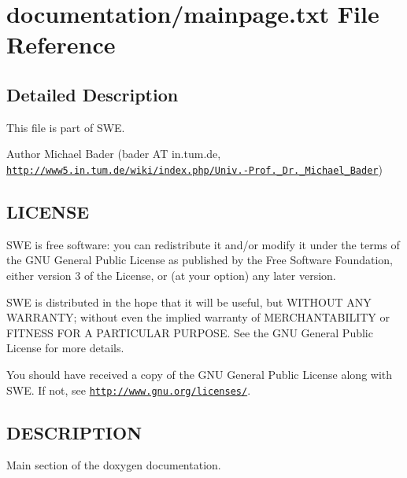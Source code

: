 \hypertarget{mainpage_8txt}{\section{documentation/mainpage.txt File Reference}
\label{mainpage_8txt}
}


\subsection{Detailed Description}
This file is part of S\-W\-E.

\begin{DoxyAuthor}{Author}
Michael Bader (bader A\-T in.\-tum.\-de, \href{http://www5.in.tum.de/wiki/index.php/Univ.-Prof._Dr._Michael_Bader}{\tt http\-://www5.\-in.\-tum.\-de/wiki/index.\-php/\-Univ.-\/\-Prof.\-\_\-\-Dr.\-\_\-\-Michael\-\_\-\-Bader})
\end{DoxyAuthor}
\hypertarget{Writer_8hh_LICENSE}{}\subsection{L\-I\-C\-E\-N\-S\-E}\label{Writer_8hh_LICENSE}
S\-W\-E is free software\-: you can redistribute it and/or modify it under the terms of the G\-N\-U General Public License as published by the Free Software Foundation, either version 3 of the License, or (at your option) any later version.

S\-W\-E is distributed in the hope that it will be useful, but W\-I\-T\-H\-O\-U\-T A\-N\-Y W\-A\-R\-R\-A\-N\-T\-Y; without even the implied warranty of M\-E\-R\-C\-H\-A\-N\-T\-A\-B\-I\-L\-I\-T\-Y or F\-I\-T\-N\-E\-S\-S F\-O\-R A P\-A\-R\-T\-I\-C\-U\-L\-A\-R P\-U\-R\-P\-O\-S\-E. See the G\-N\-U General Public License for more details.

You should have received a copy of the G\-N\-U General Public License along with S\-W\-E. If not, see \href{http://www.gnu.org/licenses/}{\tt http\-://www.\-gnu.\-org/licenses/}.\hypertarget{NetCdfWriter_8hh_DESCRIPTION}{}\subsection{D\-E\-S\-C\-R\-I\-P\-T\-I\-O\-N}\label{NetCdfWriter_8hh_DESCRIPTION}
Main section of the doxygen documentation. 